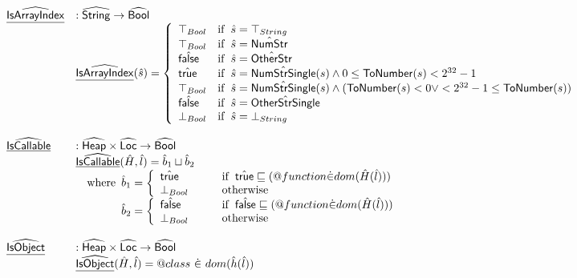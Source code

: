 \[\begin{array}{ll}
\ahf{IsArrayIndex} & : \abs{String} \rightarrow \abs{Bool} \\
& \ahf{IsArrayIndex}(\hat{s}) = \left\{
      \begin{array}{ll}
        \top_{Bool} & \ifc{\hat{s} = \top_{String}}\\
        \top_{Bool} & \ifc{\hat{s} = \hat{\SF{NumStr}}}\\
        \afalse     & \ifc{\hat{s} = \hat{\SF{OtherStr}}}\\
        \atrue      & \ifc{\hat{s} = \hat{\SF{NumStrSingle}}(s) \land 0 \leq \SF{ToNumber}(s) < 2^{32}-1}\\
        \top_{Bool} & \ifc{\hat{s} = \hat{\SF{NumStrSingle}}(s) \land (\SF{ToNumber}(s) < 0 \lor < 2^{32}-1 \leq \SF{ToNumber}(s))}\\
        \afalse     & \ifc{\hat{s} = \hat{\SF{OtherStrSingle}}}\\
        \bot_{Bool} & \ifc{\hat{s} = \bot_{String}} \\
      \end{array}
    \right.\\
\\

\ahf{IsCallable} & : \aHeap \times \aLoc \rightarrow \abs{Bool} \\
& \ahf{IsCallable}(\hat{H},\hat{l})
  = \hat{b}_1\sqcup\hat{b}_2 \\
& \quad\wherec{
  \hat{b}_1 = 
    \left\{
      \begin{array}{l@{\quad\quad\quad}l}
        \atrue &\ifc{\atrue\sqsubseteq(\varprop{function} \dot{\in} dom(\hat{H}(\hat{l})))}\\
        \bot_{Bool} &\owc
      \end{array}
    \right.\\
  \hat{b}_2 = 
    \left\{
      \begin{array}{l@{\quad\quad\quad}l}
        \afalse &\ifc{\afalse\sqsubseteq(\varprop{function} \dot{\in} dom(\hat{H}(\hat{l})))}\\
        \bot_{Bool} &\owc
      \end{array}
    \right.\\
  }\\
\\

\ahf{IsObject} & : \aHeap \times \aLoc \rightarrow \abs{Bool} \\
& \ahf{IsObject}(\hat{H},\hat{l}) = \varprop{class} ~ \dot{\in} ~ dom(\hat{h}(\hat{l})) \\
\\
\end{array}
\]
\\\\

